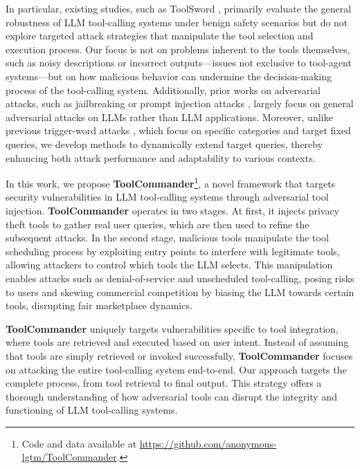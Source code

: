 In particular, existing studies, such as ToolSword \cite{ye2024toolsword}, primarily evaluate the general robustness of LLM tool-calling systems under benign safety scenarios but do not explore targeted attack strategies that manipulate the tool selection and execution process. Our focus is not on problems inherent to the tools themselves, such as noisy descriptions or incorrect outputs—issues not exclusive to tool-agent systems—but on how malicious behavior can undermine the decision-making process of the tool-calling system. Additionally, prior works on adversarial attacks, such as jailbreaking or prompt injection attacks \cite{chao2023jailbreaking, zhu2023autodan, yu2023gptfuzzer}, largely focus on general adversarial attacks on LLMs rather than LLM applications. Moreover, unlike previous trigger-word attacks \cite{chaudhari2024phantom}, which focus on specific categories and target fixed queries, we develop methods to dynamically extend target queries, thereby enhancing both attack performance and adaptability to various contexts.

In this work, we propose \textbf{ToolCommander}\footnote{Code and data available at \href{https://github.com/anonymous-lgtm/ToolCommander}{https://github.com/anonymous-lgtm/ToolCommander}.}, a novel framework that targets security vulnerabilities in LLM tool-calling systems through adversarial tool injection. \textbf{ToolCommander} operates in two stages. At first, it injects privacy theft tools to gather real user queries, which are then used to refine the subsequent attacks. In the second stage, malicious tools manipulate the tool scheduling process by exploiting entry points to interfere with legitimate tools, allowing attackers to control which tools the LLM selects. This manipulation enables attacks such as denial-of-service and unscheduled tool-calling, posing risks to users and skewing commercial competition by biasing the LLM towards certain tools, disrupting fair marketplace dynamics.

\textbf{ToolCommander} uniquely targets vulnerabilities specific to tool integration, where tools are retrieved and executed based on user intent. Instead of assuming that tools are simply retrieved or invoked successfully, \textbf{ToolCommander} focuses on attacking the entire tool-calling system end-to-end. Our approach targets the complete process, from tool retrieval to final output. This strategy offers a thorough understanding of how adversarial tools can disrupt the integrity and functioning of LLM tool-calling systems.

